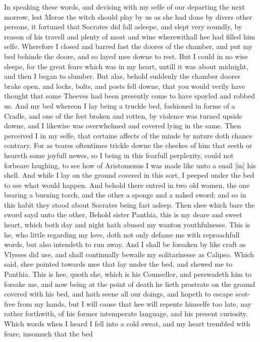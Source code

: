 In speaking these words, and devising with my selfe of our departing the next
morrow, lest Meroe the witch should play by us as she had done by divers other
persons, it fortuned that Socrates did fall asleepe, and slept very soundly, by
reason of his travell and plenty of meat and wine wherewithall hee had filled
him selfe. Wherefore I closed and barred fast the doores of the chamber, and
put my bed behinde the doore, and so layed mee downe to rest. But I could in no
wise sleepe, for the great feare which was in my heart, untill it was about
midnight, and then I began to slumber. But alas, behold suddenly the chamber
doores brake open, and locks, bolts, and posts fell downe, that you would
verily have thought that some Theeves had been presently come to have spoyled
and robbed us. And my bed whereon I lay being a truckle bed, fashioned in forme
of a Cradle, and one of the feet broken and rotten, by violence was turned
upside downe, and I likewise was overwhelmed and covered lying in the same.
Then perceived I in my selfe, that certaine affects of the minde by nature doth
chance contrary. For as teares oftentimes trickle downe the cheekes of him that
seeth or heareth some joyfull newes, so I being in this fearfull perplexity,
could not forbeare laughing, to see how of Aristomenus I was made like unto a
snail [in] his shell. And while I lay on the ground covered in this sort, I
peeped under the bed to see what would happen. And behold there entred in two
old women, the one bearing a burning torch, and the other a sponge and a naked
sword; and so in this habit they stood about Socrates being fast asleep. Then
shee which bare the sword sayd unto the other, Behold sister Panthia, this is
my deare and sweet heart, which both day and night hath abused my wanton
youthfulnesse. This is he, who little regarding my love, doth not only defame
me with reproachfull words, but also intendeth to run away. And I shall be
forsaken by like craft as Vlysses did use, and shall continually bewaile my
solitarinesse as Calipso. Which said, shee pointed towards mee that lay under
the bed, and shewed me to Panthia. This is hee, quoth she, which is his
Counsellor, and perswadeth him to forsake me, and now being at the point of
death he lieth prostrate on the ground covered with his bed, and hath seene all
our doings, and hopeth to escape scot-free from my hands, but I will cause that
hee will repente himselfe too late, nay rather forthwith, of his former
intemperate language, and his present curiosity. Which words when I heard I
fell into a cold sweat, and my heart trembled with feare, insomuch that the bed
